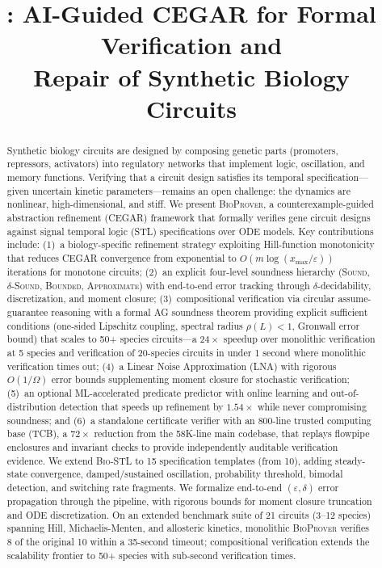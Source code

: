 \documentclass[11pt]{article}
\title{\bioprover{}: AI-Guided CEGAR for Formal Verification and\\
Repair of Synthetic Biology Circuits}
\date{}
\newcommand{\bioprover}{\textsc{BioProver}}
\newcommand{\cegar}{\textsc{CEGAR}}
\newcommand{\stl}{\textsc{STL}}
\newcommand{\biostl}{\textsc{Bio-STL}}
\begin{document}
\maketitle

\begin{abstract}
Synthetic biology circuits are designed by composing genetic parts
(promoters, repressors, activators) into regulatory networks that
implement logic, oscillation, and memory functions. Verifying that a
circuit design satisfies its temporal specification---given uncertain
kinetic parameters---remains an open challenge: the dynamics are
nonlinear, high-dimensional, and stiff. We present \bioprover{}, a
counterexample-guided abstraction refinement (\cegar{}) framework
that formally verifies gene circuit designs against
signal temporal logic (\stl{}) specifications over ODE models. Key
contributions include: (1)~a biology-specific refinement strategy
exploiting Hill-function monotonicity that reduces \cegar{}
convergence from exponential to $O(m \log(x_{\max}/\varepsilon))$
iterations for monotone circuits; (2)~an explicit four-level
soundness hierarchy (\textsc{Sound}, \textsc{$\delta$-Sound},
\textsc{Bounded}, \textsc{Approximate}) with end-to-end error
tracking through $\delta$-decidability, discretization, and moment
closure; (3)~compositional verification via circular
assume-guarantee reasoning with a formal AG soundness theorem
providing explicit sufficient conditions (one-sided Lipschitz
coupling, spectral radius $\rho(L) < 1$, Gronwall error bound) that
scales to 50+ species circuits---a $24\times$ speedup over
monolithic verification at 5 species and verification of 20-species
circuits in under 1 second where monolithic verification times out;
(4)~a Linear Noise Approximation (LNA) with rigorous $O(1/\Omega)$
error bounds supplementing moment closure for stochastic
verification; (5)~an optional ML-accelerated predicate predictor
with online learning and out-of-distribution detection that speeds
up refinement by $1.54\times$ while never compromising soundness;
and (6)~a standalone certificate verifier with an 800-line trusted
computing base (TCB), a $72\times$ reduction from the 58K-line main
codebase, that replays flowpipe enclosures and invariant checks to
provide independently auditable verification evidence. We extend
\biostl{} to 15 specification templates (from 10), adding
steady-state convergence, damped/sustained oscillation, probability
threshold, bimodal detection, and switching rate fragments. We
formalize end-to-end $(\varepsilon,\delta)$ error propagation through
the pipeline, with rigorous bounds for moment closure truncation and
ODE discretization. On an extended benchmark suite of 21 circuits
(3--12 species) spanning Hill, Michaelis-Menten, and allosteric
kinetics, monolithic \bioprover{} verifies 8 of the original 10
within a 35-second timeout; compositional verification extends the
scalability frontier to 50+ species with sub-second verification
times.
\end{abstract}
\end{document}
